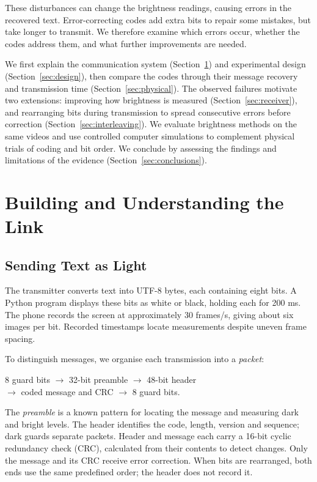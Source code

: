 \documentclass[conference,a4paper]{IEEEtran}
\begin{document}
These disturbances can change the brightness readings, causing errors in
the recovered text. Error-correcting codes add extra bits to repair some
mistakes, but take longer to transmit. We therefore examine which errors
occur, whether the codes address them, and what further improvements are
needed.

We first explain the communication system (Section~\ref{sec:system}) and
experimental design (Section~\ref{sec:design}), then compare the codes
through their message recovery and transmission time (Section~\ref{sec:physical}).
The observed failures motivate two extensions: improving how brightness is
measured (Section~\ref{sec:receiver}), and rearranging bits during transmission
to spread consecutive errors before correction (Section~\ref{sec:interleaving}).
We evaluate brightness methods on the same
videos and use controlled computer simulations to complement physical
trials of coding and bit order. We conclude by
assessing the findings and limitations of the evidence (Section~\ref{sec:conclusions}).

\section{Building and Understanding the Link}
\label{sec:system}
\subsection{Sending Text as Light}
The transmitter converts text into UTF-8 bytes, each containing eight bits.
A Python program displays these bits as white or black, holding each for
200 ms. The phone records the screen at approximately 30 frames/s, giving
about six images per bit. Recorded timestamps locate measurements despite
uneven frame spacing.

To distinguish messages, we organise each transmission into a \emph{packet}:
\begin{center}\footnotesize
8 guard bits $\to$ 32-bit preamble $\to$ 48-bit header\\
$\to$ coded message and CRC $\to$ 8 guard bits.
\end{center}
The \emph{preamble} is a known pattern for locating the message and
measuring dark and bright levels. The header identifies the code, length, version
and sequence; dark guards separate packets. Header and message each carry
a 16-bit cyclic redundancy check (CRC), calculated from their contents to
detect changes. Only the message and its CRC receive error correction.
When bits are rearranged, both ends use the same predefined order;
the header does not record it.
\end{document}
